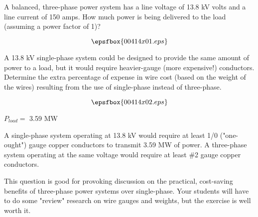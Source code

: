

A balanced, three-phase power system has a line voltage of 13.8 kV volts and a line current of 150 amps.  How much power is being delivered to the load (assuming a power factor of 1)?

$$\epsfbox{00414x01.eps}$$

A 13.8 kV single-phase system could be designed to provide the same amount of power to a load, but it would require heavier-gauge (more expensive!) conductors.  Determine the extra percentage of expense in wire cost (based on the weight of the wires) resulting from the use of single-phase instead of three-phase.

$$\epsfbox{00414x02.eps}$$







$P_{load} =$ 3.59 MW

\vskip 5pt

A single-phase system operating at 13.8 kV would require at least 1/0 ("one-ought") gauge copper conductors to transmit 3.59 MW of power.  A three-phase system operating at the same voltage would require at least \#2 gauge copper conductors.







This question is good for provoking discussion on the practical, cost-saving benefits of three-phase power systems over single-phase.  Your students will have to do some "review" research on wire gauges and weights, but the exercise is well worth it.




